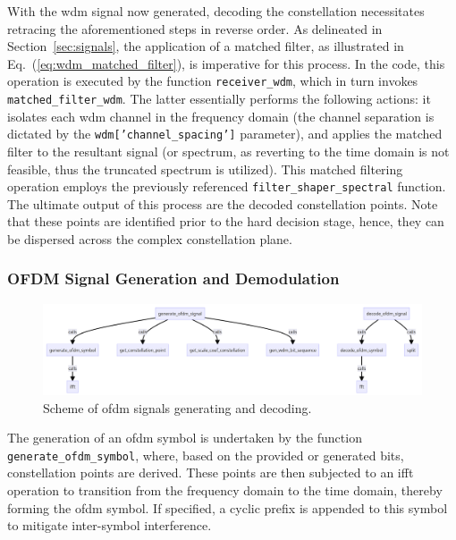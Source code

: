 With the \acrshort{wdm} signal now generated, decoding the constellation necessitates retracing the aforementioned steps in reverse order. As delineated in Section~\ref{sec:signals}, the application of a matched filter, as illustrated in Eq.~(\ref{eq:wdm_matched_filter}), is imperative for this process. In the code, this operation is executed by the function \texttt{receiver\_wdm}, which in turn invokes \texttt{matched\_filter\_wdm}. The latter essentially performs the following actions: it isolates each \acrshort{wdm} channel in the frequency domain (the channel separation is dictated by the \texttt{wdm['channel\_spacing']} parameter), and applies the matched filter to the resultant signal (or spectrum, as reverting to the time domain is not feasible, thus the truncated spectrum is utilized). This matched filtering operation employs the previously referenced \texttt{filter\_shaper\_spectral} function. The ultimate output of this process are the decoded constellation points. Note that these points are identified prior to the hard decision stage, hence, they can be dispersed across the complex constellation plane.



\subsubsection{OFDM Signal Generation and Demodulation}

\begin{figure}[thpb]
   \centering
    \includegraphics[width=1\linewidth]{images/hpcom/odfm_creation.png}
    \caption{Scheme of \acrshort{ofdm} signals generating and decoding.}
    \label{fig:ofdm_code_scheme}
\end{figure}

The generation of an \acrshort{ofdm} symbol is undertaken by the function \texttt{generate\_ofdm\_symbol}, where, based on the provided or generated bits, constellation points are derived. These points are then subjected to an \acrfull{ifft} operation to transition from the frequency domain to the time domain, thereby forming the \acrshort{ofdm} symbol. If specified, a cyclic prefix is appended to this symbol to mitigate inter-symbol interference. 

